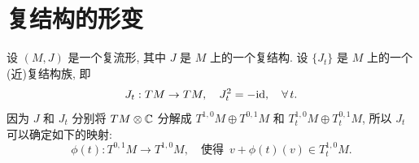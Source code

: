    \section{复结构的形变}
    设 $(M,J)$ 是一个复流形, 其中 $J$ 是 $M$ 上的一个复结构. 设 $\{J_t\}$ 是 $M$ 上的一个(近)复结构族, 即 
    \begin{equation*}
        J_t:TM\rightarrow TM,\quad J_t^2 = -{\rm id},\quad\forall\,t.
    \end{equation*}
    因为 $J$ 和 $J_t$ 分别将 $TM\otimes\mathbb{C}$ 分解成 $T^{1,0}M\oplus T^{0,1}M$ 和 $T^{1,0}_tM\oplus T^{0,1}_tM$, 
    所以 $J_t$ 可以确定如下的映射:
    \begin{equation*}
        \phi(t):T^{0,1}M\rightarrow T^{1,0}M,\quad \text{使得 }\, v+\phi(t)(v)\in T^{1,0}_tM.
    \end{equation*}

